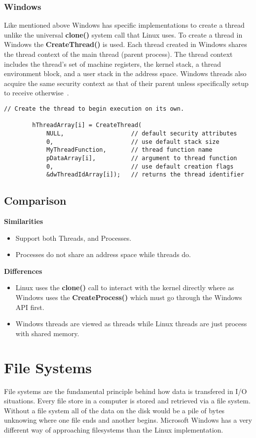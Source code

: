 \documentclass[letterpaper,10pt,notitlepage,fleqn]{article}
\begin{document}
\subsubsection*{Windows}
Like mentioned above Windows has specific implementations to create a thread unlike 
the universal \textbf{clone()} system call that Linux uses. To create a thread in 
Windows the \textbf{CreateThread()} is used. Each thread created in Windows shares 
the thread context of the main thread (parent process). The thread context includes 
the thread's set of machine registers, the kernel stack, a thread environment block, 
and a user stack in the address space. Windows threads also acquire the same security 
context as that of their parent unless specifically setup to receive otherwise~\cite{WI16}. 
\begin{lstlisting}
// Create the thread to begin execution on its own.

        hThreadArray[i] = CreateThread( 
            NULL,                   // default security attributes
            0,                      // use default stack size  
            MyThreadFunction,       // thread function name
            pDataArray[i],          // argument to thread function 
            0,                      // use default creation flags 
            &dwThreadIdArray[i]);   // returns the thread identifier 
\end{lstlisting}


\subsection*{Comparison}
\noindent \textbf{Similarities}
\begin{itemize}
    \item Support both Threads, and Processes.
    \item Processes do not share an address space while threads do.
\end{itemize}
\noindent \textbf{Differences}
\begin{itemize}
    \item Linux uses the \textbf{clone()} call to interact with the kernel directly 
    where as Windows uses the \textbf{CreateProcess()} which must go through the 
    Windows API first.
    \item Windows threads are viewed as threads while Linux threads are just process
    with shared memory.
\end{itemize}

\section{File Systems}
File systems are the fundamental principle behind how data is transfered in I/O situations. 
Every file store in a computer is stored and retrieved via a file system. Without 
a file system all of the data on the disk would be a pile of bytes unknowing where one 
file ends and another begins. Microsoft Windows has a very different way of approaching 
filesystems than the Linux implementation.
\end{document}
